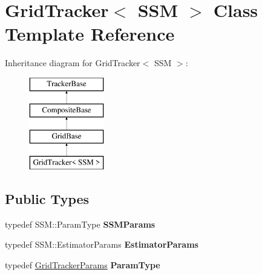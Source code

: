 \hypertarget{classGridTracker}{\section{Grid\-Tracker$<$ S\-S\-M $>$ Class Template Reference}
\label{classGridTracker}
}
Inheritance diagram for Grid\-Tracker$<$ S\-S\-M $>$\-:\begin{figure}[H]
\begin{center}
\leavevmode
\includegraphics[height=4.000000cm]{classGridTracker}
\end{center}
\end{figure}
\subsection*{Public Types}
\begin{DoxyCompactItemize}
\item 
\hypertarget{classGridTracker_a6d6d95f72d9cdd6d71a774d962d31b05}{typedef S\-S\-M\-::\-Param\-Type {\bfseries S\-S\-M\-Params}}\label{classGridTracker_a6d6d95f72d9cdd6d71a774d962d31b05}

\item 
\hypertarget{classGridTracker_ae46588aa72d85366d39646143d9334f9}{typedef S\-S\-M\-::\-Estimator\-Params {\bfseries Estimator\-Params}}\label{classGridTracker_ae46588aa72d85366d39646143d9334f9}

\item 
\hypertarget{classGridTracker_ab195f9f5ab65de67e4eb9ff58d684c02}{typedef \hyperlink{structGridTrackerParams}{Grid\-Tracker\-Params} {\bfseries Param\-Type}}\label{classGridTracker_ab195f9f5ab65de67e4eb9ff58d684c02}

\end{DoxyCompactItemize}
